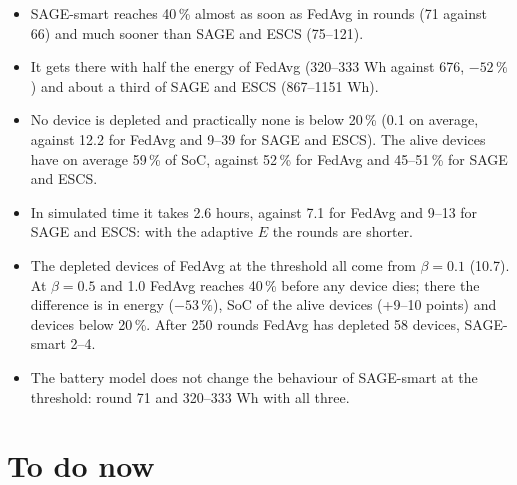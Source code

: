\documentclass[11pt,a4paper]{article}
\begin{document}
\begin{itemize}
  \item SAGE-smart reaches 40\,\% almost as soon as FedAvg in rounds (71
        against 66) and much sooner than SAGE and ESCS (75--121).
  \item It gets there with half the energy of FedAvg (320--333 Wh against
        676, $-52\,\%$) and about a third of SAGE and ESCS (867--1151 Wh).
  \item No device is depleted and practically none is below 20\,\% (0.1 on
        average, against 12.2 for FedAvg and 9--39 for SAGE and ESCS). The
        alive devices have on average 59\,\% of SoC, against 52\,\% for
        FedAvg and 45--51\,\% for SAGE and ESCS.
  \item In simulated time it takes 2.6 hours, against 7.1 for FedAvg and
        9--13 for SAGE and ESCS: with the adaptive $E$ the rounds are shorter.
  \item The depleted devices of FedAvg at the threshold all come from $\beta =
        0.1$ (10.7). At $\beta = 0.5$ and 1.0 FedAvg reaches 40\,\% before any
        device dies; there the difference is in energy ($-53\,\%$), SoC of the
        alive devices (+9--10 points) and devices below 20\,\%. After 250
        rounds FedAvg has depleted 58 devices, SAGE-smart 2--4.
  \item The battery model does not change the behaviour of SAGE-smart at the
        threshold: round 71 and 320--333 Wh with all three.
\end{itemize}

\newpage

\section{To do now}
\label{sec:todo}
\end{document}
